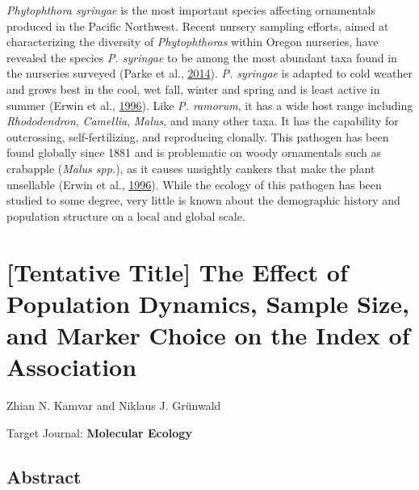 \documentclass[double,12pt]{beavtex}
\begin{document}
  \emph{Phytophthora syringae} is the most important species affecting
  ornamentals produced in the Pacific Northwest. Recent nursery sampling
  efforts, aimed at characterizing the diversity of \emph{Phytophthoras}
  within Oregon nurseries, have revealed the species \emph{P. syringae} to
  be among the most abundant taxa found in the nurseries surveyed (Parke
  et al., \protect\hyperlink{ref-parke2014phytophthora}{2014}). \emph{P.
  syringae} is adapted to cold weather and grows best in the cool, wet
  fall, winter and spring and is least active in summer (Erwin et al.,
  \protect\hyperlink{ref-erwin1996phytophthora}{1996}). Like \emph{P.
  ramorum}, it has a wide host range including \emph{Rhododendron},
  \emph{Camellia}, \emph{Malus}, and many other taxa. It has the
  capability for outcrossing, self-fertilizing, and reproducing clonally.
  This pathogen has been found globally since 1881 and is problematic on
  woody ornamentals such as crabapple (\emph{Malus spp.}), as it causes
  unsightly cankers that make the plant unsellable (Erwin et al.,
  \protect\hyperlink{ref-erwin1996phytophthora}{1996}). While the ecology
  of this pathogen has been studied to some degree, very little is known
  about the demographic history and population structure on a local and
  global scale.
  
  \chapter{{[}Tentative Title{]} The Effect of Population Dynamics, Sample
  Size, and Marker Choice on the Index of
  Association}\label{tentative-title-the-effect-of-population-dynamics-sample-size-and-marker-choice-on-the-index-of-association}
  
  \singlespacing
  
  \begin{center}
  
  
  Zhian N. Kamvar and Niklaus J. Grünwald
  
  
  
  \end{center}\vspace*{\fill}
  
  Target Journal: \textbf{Molecular Ecology}
  
  \doublespacing
  \newpage
  
  \section{Abstract}\label{abstract-4}
  
\end{document}
